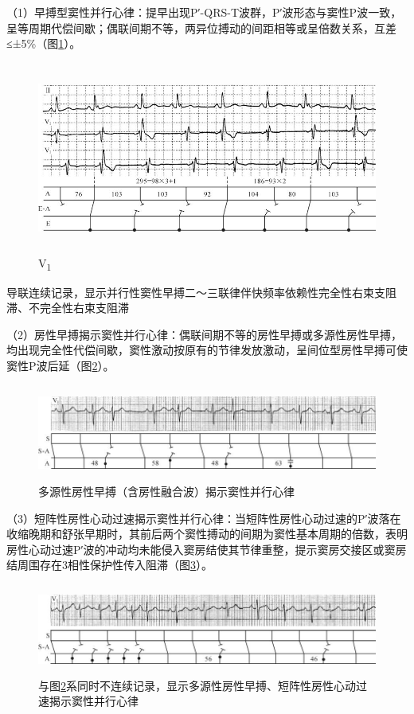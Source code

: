（1）早搏型窦性并行心律：提早出现P′-QRS-T波群，P′波形态与窦性P波一致，呈等周期代偿间歇；偶联间期不等，两异位搏动的间距相等或呈倍数关系，互差≤±5\%（图\ref{fig16-1}）。

\begin{figure}[!htbp]
 \centering
 \includegraphics[width=5.65625in,height=2.47917in]{./images/Image00277.jpg}
 \captionsetup{justification=centering}
 \caption{V\textsubscript{1}}
 \label{fig16-1}
  \end{figure} 
导联连续记录，显示并行性窦性早搏二～三联律伴快频率依赖性完全性右束支阻滞、不完全性右束支阻滞

（2）房性早搏揭示窦性并行心律：偶联间期不等的房性早搏或多源性房性早搏，均出现完全性代偿间歇，窦性激动按原有的节律发放激动，呈间位型房性早搏可使窦性P波后延（图\ref{fig16-2}）。

\begin{figure}[!htbp]
 \centering
 \includegraphics[width=5.80208in,height=1.25in]{./images/Image00278.jpg}
 \captionsetup{justification=centering}
 \caption{多源性房性早搏（含房性融合波）揭示窦性并行心律}
 \label{fig16-2}
  \end{figure} 

（3）短阵性房性心动过速揭示窦性并行心律：当短阵性房性心动过速的P′波落在收缩晚期和舒张早期时，其前后两个窦性搏动的间期为窦性基本周期的倍数，表明房性心动过速P′波的冲动均未能侵入窦房结使其节律重整，提示窦房交接区或窦房结周围存在3相性保护性传入阻滞（图\ref{fig16-3}）。

\begin{figure}[!htbp]
 \centering
 \includegraphics[width=5.77083in,height=1.17708in]{./images/Image00279.jpg}
 \captionsetup{justification=centering}
 \caption{与图\ref{fig16-2}系同时不连续记录，显示多源性房性早搏、短阵性房性心动过速揭示窦性并行心律}
 \label{fig16-3}
  \end{figure} 

